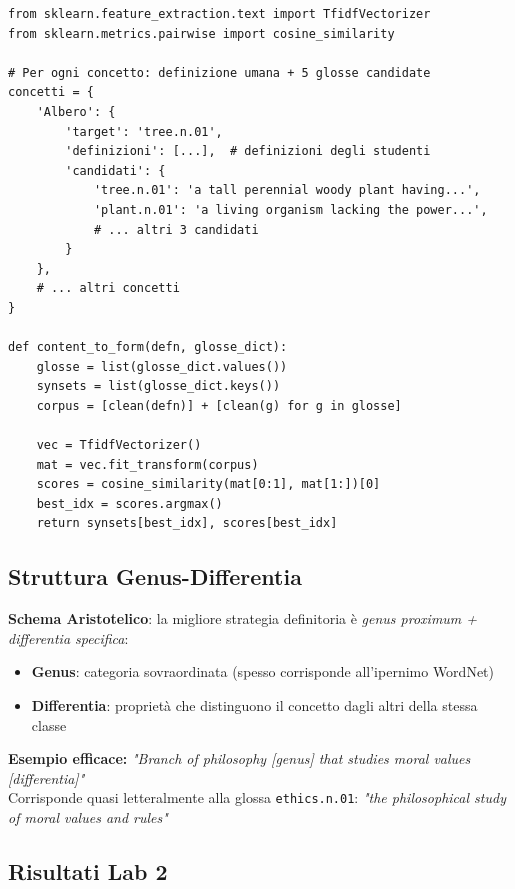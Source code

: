 \documentclass[12pt,a4paper]{article}
\begin{document}
\begin{codebox}
\begin{lstlisting}[style=python]
from sklearn.feature_extraction.text import TfidfVectorizer
from sklearn.metrics.pairwise import cosine_similarity

# Per ogni concetto: definizione umana + 5 glosse candidate
concetti = {
    'Albero': {
        'target': 'tree.n.01',
        'definizioni': [...],  # definizioni degli studenti
        'candidati': {
            'tree.n.01': 'a tall perennial woody plant having...',
            'plant.n.01': 'a living organism lacking the power...',
            # ... altri 3 candidati
        }
    },
    # ... altri concetti
}

def content_to_form(defn, glosse_dict):
    glosse = list(glosse_dict.values())
    synsets = list(glosse_dict.keys())
    corpus = [clean(defn)] + [clean(g) for g in glosse]

    vec = TfidfVectorizer()
    mat = vec.fit_transform(corpus)
    scores = cosine_similarity(mat[0:1], mat[1:])[0]
    best_idx = scores.argmax()
    return synsets[best_idx], scores[best_idx]
\end{lstlisting}
\end{codebox}

\subsection{Struttura Genus-Differentia}

\begin{defbox}
\textbf{Schema Aristotelico}: la migliore strategia definitoria \`e \emph{genus proximum + differentia specifica}:
\begin{itemize}
  \item \textbf{Genus}: categoria sovraordinata (spesso corrisponde all'ipernimo WordNet)
  \item \textbf{Differentia}: propriet\`a che distinguono il concetto dagli altri della stessa classe
\end{itemize}
\textbf{Esempio efficace:} \textit{"Branch of philosophy [genus] that studies moral values [differentia]"}\\
Corrisponde quasi letteralmente alla glossa \texttt{ethics.n.01}: \textit{"the philosophical study of moral values and rules"}
\end{defbox}

\subsection{Risultati Lab 2}
\end{document}
